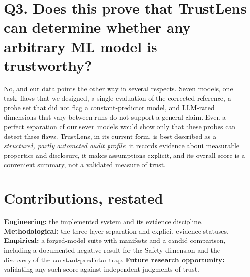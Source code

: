 \section{Q3. Does this prove that TrustLens can determine whether any arbitrary ML model is trustworthy?}
No, and our data points the other way in several respects. Seven models, one task, flaws that we designed, a single evaluation of the corrected reference, a probe set that did not flag a constant-predictor model, and LLM-rated dimensions that vary between runs do not support a general claim. Even a perfect separation of our seven models would show only that these probes can detect these flaws. TrustLens, in its current form, is best described as a \emph{structured, partly automated audit profile}: it records evidence about measurable properties and disclosure, it makes assumptions explicit, and its overall score is a convenient summary, not a validated measure of trust.

\section{Contributions, restated}
\textbf{Engineering:} the implemented system and its evidence discipline. \textbf{Methodological:} the three-layer separation and explicit evidence statuses. \textbf{Empirical:} a forged-model suite with manifests and a candid comparison, including a documented negative result for the Safety dimension and the discovery of the constant-predictor trap. \textbf{Future research opportunity:} validating any such score against independent judgments of trust.

